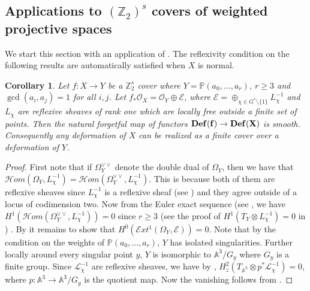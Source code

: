 \documentclass[12pt,twoside,]{amsart}
\theoremstyle{plain}
\newtheorem{corollary}[theorem]{Corollary}
\theoremstyle{definition}
\begin{document}
\subsection{Applications to  $(\mathbb{Z}_2)^s$ covers of weighted projective spaces}

We start this section with an application of .
The reflexivity condition on the following results are automatically satisfied when $X$ is normal.
\begin{corollary}\label{every def is an finite cover over a WPS reflexive}
Let $f: X \to Y$ be a $\mathbb{Z}_2^s$ cover where $Y = \mathbb{P}(a_0,...,a_r)$, $r \geq 3$ and $\operatorname{gcd}(a_i, a_j) = 1$ for all $i,j$. Let $f_*\mathcal{O}_X = \mathcal{O}_Y \oplus \mathcal{E}$, where $\mathcal{E} = \oplus_{\chi \in G^* \setminus \{1\}} L_{\chi}^{-1}$ and $L_{\chi}$ are reflexive sheaves of rank one which are locally free outside a finite set of points. Then the natural forgetful map of functors $\bf Def(f) \to \bf Def(X)$ is smooth. Consequently any deformation of $X$ can be realized as a finite cover over a deformation of $Y$. 
    \end{corollary}
\begin{proof}
    First note that if $\Omega_Y^{\vee \vee}$ denote the double dual of $\Omega_Y$, then we have that $\mathcal{H}om(\Omega_Y, L_{\chi}^{-1}) = \mathcal{H}om(\Omega_Y^{\vee \vee}, L_{\chi}^{-1})$. This is because both of them are reflexive sheaves since $L_{\chi}^{-1}$ is a reflexive sheaf (see \cite[Lemma $31.12.8$]{stacks-project}) and they agree outside of a locus of codimension two. Now from the Euler exact sequence (see \cite[Theorem $8.1.6$]{cox2024toric}, we have $H^1(\mathcal{H}om(\Omega_Y^{\vee \vee}, L_{\chi}^{-1})) = 0$ since $r \geq 3$ (see the proof of $H^1(T_Y \otimes L_{\chi}^{-1}) = 0$ in ) . By  it remains to show that $H^0(\mathcal{E}xt^1(\Omega_Y, \mathcal{E})) = 0$. Note that by the condition on the weights of $\mathbb{P}(a_0,...,a_r)$, $Y$ has isolated singularities. Further locally around every singular point $y$, $Y$ is isomorphic to $\mathbb{A}^3/G_y$ where $G_y$ is a finite group. Since $\mathcal{L}_{\chi}^{-1}$ are reflexive sheaves, we have by , $H_z^2(T_{\mathbb{A}^3}\otimes p^*\mathcal{L}_{\chi}^{-1}) = 0$, where $p: \mathbb{A}^3 \to \mathbb{A}^3/G_y$ is the quotient map. Now the vanishing follows from . 
\end{proof}
\end{document}
